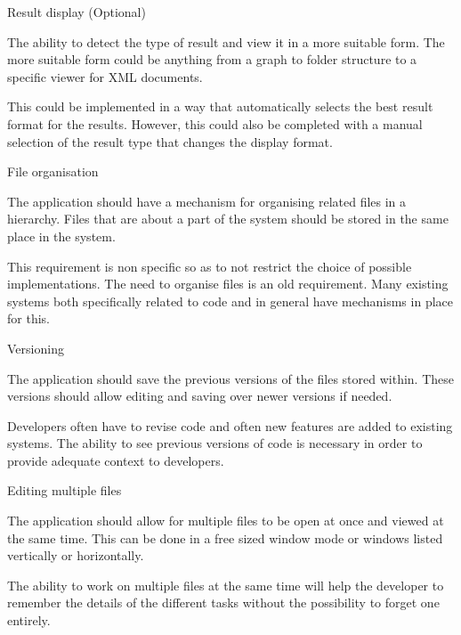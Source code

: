 \begin{requirement}{Result display (Optional)}
\noindent

The ability to detect the type of result and view it in a
more suitable form. The more suitable form could be anything from a
graph to folder structure to a specific viewer for XML documents.

This could be implemented in a way that automatically selects the best result
format for the results. However, this could also be completed with a manual
selection of the result type that changes the display format.
\end{requirement}

\begin{requirement}{File organisation}
\noindent

The application should have a mechanism for organising related files in
a hierarchy. Files that are about a part of the system should be stored
in the same place in the system.

This requirement is non specific so as to not restrict the choice of possible
implementations. The need to organise files is an old requirement. Many
existing systems both specifically related to code and in general have
mechanisms in place for this.
\end{requirement}

\begin{requirement}{Versioning}
\noindent

The application should save the previous versions of the files stored within.
These versions should allow editing and saving over newer versions if needed.

Developers often have to revise code and often new features are added to
existing systems. The ability to see previous versions of code is necessary in
order to provide adequate context to developers.
\end{requirement}

\begin{requirement}{Editing multiple files}
\noindent

The application should allow for multiple files to
be open at once and viewed at the same time. This can be done in a free
sized window mode or windows listed vertically or horizontally.

The ability to work on multiple files at the same time will help the developer
to remember the details of the different tasks without the possibility to
forget one entirely.
\end{requirement}

